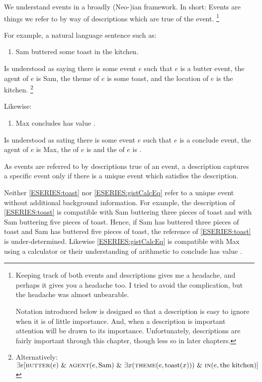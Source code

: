 \begin{note}
  We understand events in a broadly (Neo-)\citeauthor{Davidson:1967aa}ian framework.
  In short:
  Events are things we refer to by way of descriptions which are true of the event.%
    \footnote{
      Keeping track of both events and descriptions gives me a headache, and perhaps it gives you a headache too.
      I tried to avoid the complication, but the headache was almost unbearable.

      Notation introduced below is designed so that a description is easy to ignore when it is of little importance.
      And, when a description is important attention will be drawn to its importance.
      Unfortunately, descriptions are fairly important through this chapter, though less so in later chapters.
    }

  For example, a natural language sentence such as:
  \begin{enumerate}[label=\arabic*., ref=(\arabic*), series=ESERIES]
  \item
    \label{ESERIES:toast}
    Sam buttered some toast in the kitchen.
  \end{enumerate}
  Is understood as saying there is some event \(e\) such that \(e\) is a butter event, the agent of \(e\) is Sam, the theme of \(e\) is some toast, and the location of \(e\) is the kitchen.%
  \footnote{
    Alternatively:
    \(\exists e [\textsc{butter}(e)\text{ \& }\textsc{agent}(e, \text{Sam})\text{ \& }\exists x(\textsc{theme}(e, \text{toast}(x)))\text{ \& }\textsc{in}(e, \text{the kitchen})]\)
  }

  Likewise:
  \begin{enumerate}[label=\arabic*., ref=(\arabic*), resume*=ESERIES]
  \item
    \label{ESERIES:gistCalcEq}
    Max concludes \gistCalcEq{} has value .
  \end{enumerate}
  Is understood as sating there is some event \(e\) such that \(e\) is a conclude event, the agent of \(e\) is Max, the  of \(e\) is \gistCalcEq{} and the \val{} of \(e\) is .

  As events are referred to by descriptions true of an event, a description captures a specific event only if there is a unique event which satisfies the description.

  Neither \ref{ESERIES:toast} nor \ref{ESERIES:gistCalcEq} refer to a unique event without additional background information.
  For example, the description of \ref{ESERIES:toast} is compatible with Sam buttering three pieces of toast and with Sam buttering five pieces of toast.
  Hence, if Sam has buttered three pieces of toast and Sam has buttered five pieces of toast, the reference of \ref{ESERIES:toast} is under-determined.
  Likewise \ref{ESERIES:gistCalcEq} is compatible with Max using a calculator or their understanding of arithmetic to conclude \gistCalcEq{} has value .


\end{note}
